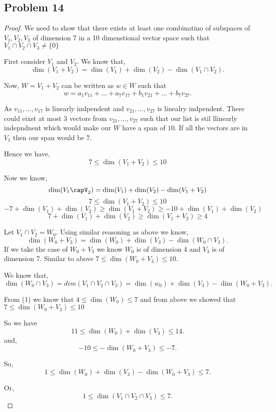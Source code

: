 \documentclass[a4paper]{report}
\begin{document}
\subsection*{Problem 14}
\begin{proof}
    We need to show that there exists at least one combinatino of subspaces of $V_1,V_2,V_3$ of dimension 7 in a 10 dimenstional vector space such that $V_1\cap V_2\cap V_3 \neq \{0\}$

    First consider $V_1$ and $V_2$. We know that, \[
    \dim(V_1+V_2) = \dim(V_1) + \dim(V_2) - \dim(V_1\cap V_2)
    .\] 

    Now, $W = V_1+V_2$ can be written as $w \in W$ such that  \[
    w = a_1v_{11}+\dots + a_7v_{17} + b_1v_{21} + \dots + b_7v_{27}
    .\] 


    As $v_{11},\dots, v_{17}$ is linearly indpendent and $v_{21},\dots, v_{27}$ is linealry indpendent. There could eixst at most 3 vectors from $v_{21},\dots,v_{27}$ such that our list is stil llinearly indepndnent which would make our $W$ have a span of $10$. If all the vectors are in  $V_1$ then our span would be $7$. 

    Hence we have,  $$7 \le \dim(V_1+V_2) \le 10$$



    Now we know, $$\dim(V_1\capV_2) = \dim(V_1) + \dim(V_2) - \dim(V_1+V_2)$$
    $$7 \le \dim(V_1+V_2) \le 10$$
    $$-7 + \dim(V_1) + \dim(V_2)  \ge \dim(V_1+V_2) \ge -10 + \dim(V_1) + \dim(V_2)$$
    $$7 + \dim(V_1) + \dim(V_2)  \ge \dim(V_1+V_2) \ge 4$$


    Let $V_1\cap V_2 = W_0$.  Using similar reasoning as above we know, \[
    \dim(W_0 + V_3) = \dim(W_0) + \dim(V_3) - \dim(W_0\cap V_3)
    .\] 
    If we take the case of $W_0 + V_3$ we know $W_0$ is of dimension 4 and $V_3$ is of dimension 7. Similar to above $7 \le \dim(W_0+V_3) \le 10$.

    We know that, \[
    \dim(W_0\cap V_3) = dim(V_1\cap V_2\cap V_3) = \dim(w_0) + \dim(V_3) - \dim(W_0+V_3)
    .\] 

    From (1) we know that $4 \le \dim(W_0) \le 7 $ and from above we showed that $7 \leq \dim(W_0 + V_3) \leq 10$ 

    So we have  \[
    11 \le \dim(W_0) + \dim(V_3) \le 14
    .\] 
    and, \[
    -10 \le -\dim(W_0+V_3) \le -7
    .\] 

    So, \[
    1 \le \dim(W_0) + \dim(V_3) - \dim(W_0+V_3) \le 7
    .\] 

    Or, \[
    1 \le \dim(V_1\cap V_2\cap V_3) \le 7
    .\] 

\end{proof}
\end{document}
